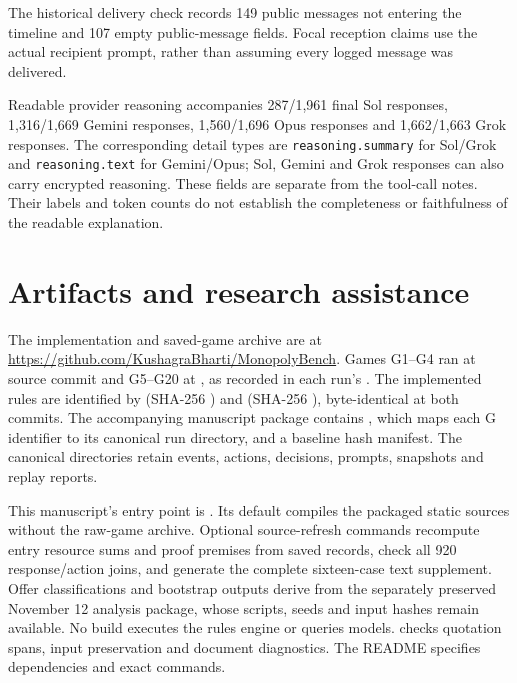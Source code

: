 The historical delivery check records 149 public messages not entering the timeline and 107 empty public-message fields. Focal reception claims use the actual recipient prompt, rather than assuming every logged message was delivered.

Readable provider reasoning accompanies 287/1,961 final Sol responses, 1,316/1,669 Gemini responses, 1,560/1,696 Opus responses and 1,662/1,663 Grok responses. The corresponding detail types are \texttt{reasoning.summary} for Sol/Grok and \texttt{reasoning.text} for Gemini/Opus; Sol, Gemini and Grok responses can also carry encrypted reasoning. These fields are separate from the tool-call notes. Their labels and token counts do not establish the completeness or faithfulness of the readable explanation.

\section{Artifacts and research assistance}
\label{app:artifacts}\label{app:provenance}
The implementation and saved-game archive are at \url{https://github.com/KushagraBharti/MonopolyBench}. Games G1--G4 ran at source commit  and G5--G20 at , as recorded in each run's . The implemented rules are identified by  (SHA-256 ) and  (SHA-256 ), byte-identical at both commits. The accompanying manuscript package contains , which maps each G identifier to its canonical run directory, and a baseline hash manifest. The canonical directories retain events, actions, decisions, prompts, snapshots and replay reports.



This manuscript's entry point is . Its default  compiles the packaged static sources without the raw-game archive. Optional source-refresh commands recompute entry resource sums and proof premises from saved records, check all 920 response/action joins, and generate the complete sixteen-case text supplement. Offer classifications and bootstrap outputs derive from the separately preserved November 12 analysis package, whose scripts, seeds and input hashes remain available. No build executes the rules engine or queries models.  checks quotation spans, input preservation and document diagnostics. The README specifies dependencies and exact commands.

